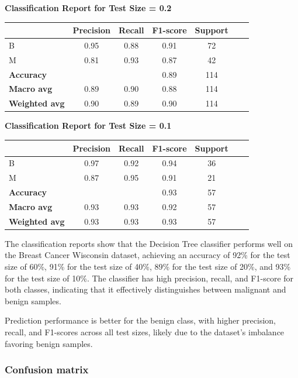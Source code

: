 \vspace{2em}

\textbf{Classification Report for Test Size = 0.2}

\begin{tabular}{lcccccc}
\hline
 & \textbf{Precision} & \textbf{Recall} & \textbf{F1-score} & \textbf{Support} \\
\hline
B & 0.95 & 0.88 & 0.91 & 72 \\
M & 0.81 & 0.93 & 0.87 & 42 \\
\hline
\textbf{Accuracy} & & & 0.89 & 114 \\
\textbf{Macro avg} & 0.89 & 0.90 & 0.88 & 114 \\
\textbf{Weighted avg} & 0.90 & 0.89 & 0.90 & 114 \\
\hline
\end{tabular}

\vspace{100em}

\textbf{Classification Report for Test Size = 0.1}

\begin{tabular}{lcccccc}
\hline
 & \textbf{Precision} & \textbf{Recall} & \textbf{F1-score} & \textbf{Support} \\
\hline
B & 0.97 & 0.92 & 0.94 & 36 \\
M & 0.87 & 0.95 & 0.91 & 21 \\
\hline
\textbf{Accuracy} & & & 0.93 & 57 \\
\textbf{Macro avg} & 0.93 & 0.93 & 0.92 & 57 \\
\textbf{Weighted avg} & 0.93 & 0.93 & 0.93 & 57 \\
\hline
\end{tabular}

The classification reports show that the Decision Tree classifier performs well on the Breast Cancer Wisconsin dataset, achieving an accuracy of 92\% for the test size of 60\%, 91\% for the test size of 40\%, 89\% for the test size of 20\%, and 93\% for the test size of 10\%. The classifier has high precision, recall, and F1-score for both classes, indicating that it effectively distinguishes between malignant and benign samples.

Prediction performance is better for the benign class, with higher precision, recall, and F1-scores across all test sizes, likely due to the dataset's imbalance favoring benign samples.
\subsubsection{Confusion matrix}

